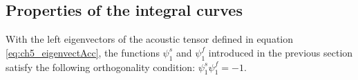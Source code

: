 
\subsection{Properties of the integral curves}
With the left eigenvectors of the acoustic tensor defined in equation \eqref{eq:ch5_eigenvectAcc}, the functions $\psi^s_1$ and $\psi^f_1$ introduced in the previous section satisfy the following orthogonality condition: $\psi^s_1\psi^f_1=-1$. 

